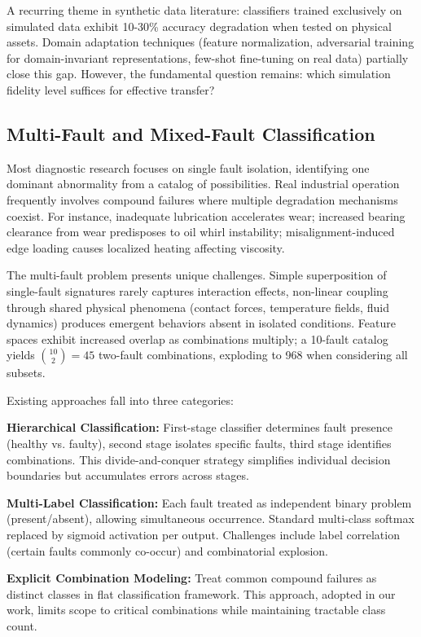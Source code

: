 \documentclass[11pt,a4paper]{article}
\begin{document}
A recurring theme in synthetic data literature: classifiers trained exclusively on simulated data exhibit 10-30\% accuracy degradation when tested on physical assets. Domain adaptation techniques (feature normalization, adversarial training for domain-invariant representations, few-shot fine-tuning on real data) partially close this gap. However, the fundamental question remains: which simulation fidelity level suffices for effective transfer?

\subsection{Multi-Fault and Mixed-Fault Classification}

Most diagnostic research focuses on single fault isolation, identifying one dominant abnormality from a catalog of possibilities. Real industrial operation frequently involves compound failures where multiple degradation mechanisms coexist. For instance, inadequate lubrication accelerates wear; increased bearing clearance from wear predisposes to oil whirl instability; misalignment-induced edge loading causes localized heating affecting viscosity.

The multi-fault problem presents unique challenges. Simple superposition of single-fault signatures rarely captures interaction effects, non-linear coupling through shared physical phenomena (contact forces, temperature fields, fluid dynamics) produces emergent behaviors absent in isolated conditions. Feature spaces exhibit increased overlap as combinations multiply; a 10-fault catalog yields ${10 \choose 2} = 45$ two-fault combinations, exploding to 968 when considering all subsets.

Existing approaches fall into three categories:

\textbf{Hierarchical Classification:} First-stage classifier determines fault presence (healthy vs. faulty), second stage isolates specific faults, third stage identifies combinations. This divide-and-conquer strategy simplifies individual decision boundaries but accumulates errors across stages.

\textbf{Multi-Label Classification:} Each fault treated as independent binary problem (present/absent), allowing simultaneous occurrence. Standard multi-class softmax replaced by sigmoid activation per output. Challenges include label correlation (certain faults commonly co-occur) and combinatorial explosion.

\textbf{Explicit Combination Modeling:} Treat common compound failures as distinct classes in flat classification framework. This approach, adopted in our work, limits scope to critical combinations while maintaining tractable class count.
\end{document}
